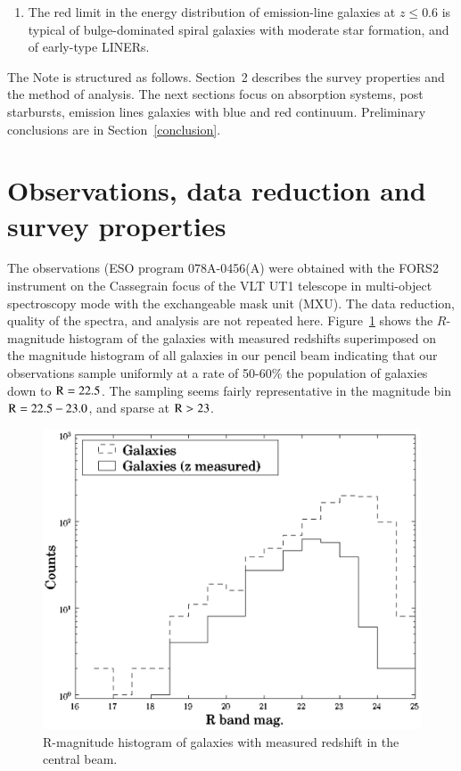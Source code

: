 \documentclass[referee]{aa}
\begin{document}
\begin{enumerate}
\item The red limit in the energy distribution of emission-line galaxies at $z \leq 0.6$ is typical of bulge-dominated spiral galaxies with moderate 
star formation, and of early-type LINERs.

\end{enumerate}

The Note is structured as follows. Section~2 describes the survey properties and the method of analysis. The next sections focus on absorption systems, post starbursts,
emission lines galaxies with blue and red continuum. Preliminary conclusions are in Section~\ref{conclusion}.


\section{Observations, data reduction and survey properties}

The observations (ESO program 078A-0456(A) were obtained with the FORS2 instrument \citep{fors:2005} on the Cassegrain focus
of the VLT UT1 telescope in multi-object spectroscopy mode with the exchangeable mask unit (MXU).
 The data reduction, quality of the spectra, and analysis  \citep{Giraud:2011} are not repeated here. Figure~\ref{central_R} shows 
 the $R$-magnitude histogram of the galaxies with measured redshifts
superimposed on the magnitude histogram of all galaxies in our pencil beam indicating that our observations
sample uniformly at a rate of 50-60\% the population of galaxies down to $\rm R = 22.5$. The sampling
seems fairly representative in the magnitude bin $\rm R = 22.5-23.0$, and sparse at $\rm  R > 23$.


\begin{figure}
   \vspace*{-0.0cm}
   \includegraphics[width=12cm]{figures/egmnFig5.eps}
       \vspace*{-0.0cm}
    \caption{R-magnitude histogram of galaxies with measured redshift in the central beam. }
    \label{central_R}
\end{figure}
\end{document}
